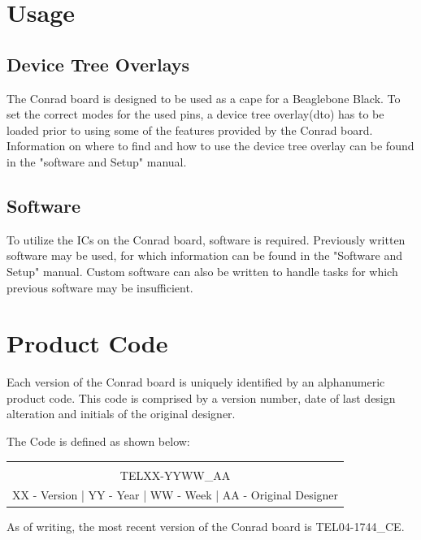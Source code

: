 \documentclass[12pt,article]{memoir}
\begin{document}
\newpage

\chapter{Usage}
\section{Device Tree Overlays}
The Conrad board is designed to be used as a cape for a Beaglebone Black. To set the correct modes for the used pins, a device tree overlay(dto) has to be loaded prior to using some of the features provided by the Conrad board. Information on where to find and how to use the device tree overlay can be found in the "software and Setup" manual.

\section{Software}
To utilize the ICs on the Conrad board, software is required. Previously written software may be used, for which information can be found in the "Software and Setup" manual. Custom software can also be written to handle tasks for which previous software may be insufficient.

\newpage

\chapter{Product Code}
Each version of the Conrad board is uniquely identified by an alphanumeric product code. This code is comprised by a version number, date of last design alteration and initials of the original designer.\par
The Code is defined as shown below:

\begin{table}[h]
\centering
{}
\begin{tabular}{|c|}
	\hline
	\huge \\
	\huge TEL\colorbox{shadecolor1}{XX}-\colorbox{shadecolor2}{YY}\colorbox{shadecolor3}{WW}\_\colorbox{shadecolor4}{AA} \\
	
	\colorbox{shadecolor1}{XX} - Version | \colorbox{shadecolor2}{YY} - Year | \colorbox{shadecolor3}{WW} - Week | \colorbox{shadecolor4}{AA} - Original Designer\\
	
	\hline
\end{tabular}
\end{table}
\noindent
As of writing, the most recent version of the Conrad board is TEL04-1744\_CE.

\end{document}
